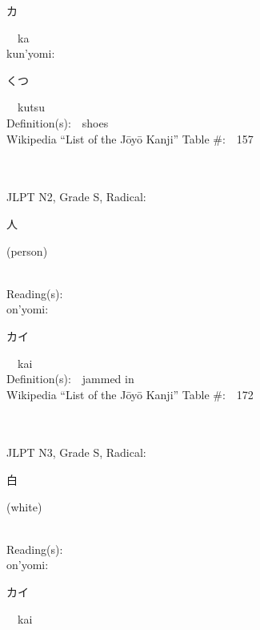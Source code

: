 \begin{multicols}{2}
{\hspace*{2em}}{\begin{CJK}{UTF8}{min} カ \end{CJK}}\ \ ka\ \ \\
{\hspace*{1em}}kun'yomi:\ \ \\
{\hspace*{2em}}{\begin{CJK}{UTF8}{min} くつ \end{CJK}}\ \ kutsu\ \ \\
Definition(s):\ \ shoes \\
Wikipedia ``List of the J\=oy\=o Kanji'' Table \#:\ \ 157 \\
\ \ \\
{\fontsize{34pt}{40pt}  }\ \ \\  %
{JLPT N2, Grade S, Radical:\ \ {\begin{CJK}{UTF8}{min} 人 \end{CJK}} (person) } \\
Reading(s):\ \ \\
{\hspace*{1em}}on'yomi:\ \ \\
{\hspace*{2em}}{\begin{CJK}{UTF8}{min} カイ \end{CJK}}\ \ kai\ \ \\
Definition(s):\ \ jammed in \\
Wikipedia ``List of the J\=oy\=o Kanji'' Table \#:\ \ 172 \\
\ \ \\
{\fontsize{34pt}{40pt}  }\ \ \\  %
{JLPT N3, Grade S, Radical:\ \ {\begin{CJK}{UTF8}{min} 白 \end{CJK}} (white) } \\
Reading(s):\ \ \\
{\hspace*{1em}}on'yomi:\ \ \\
{\hspace*{2em}}{\begin{CJK}{UTF8}{min} カイ \end{CJK}}\ \ kai\ \ \\

\end{multicols}
